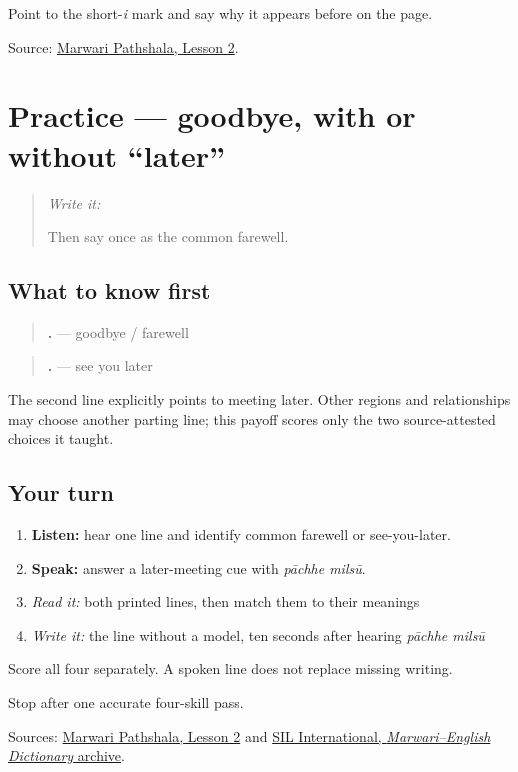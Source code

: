 \begin{tcolorbox}[breakable,colback=teal!4,colframe=teal!35!black,title={Before you move on}]
Point to the short-\emph{i} mark and say why it appears before \textbf{} on the page.

Source: \href{https://www.marwaripathshala.com/marwari-lesson-2-english}{Marwari Pathshala, Lesson 2}.
\end{tcolorbox}
\section[Practice]{Practice — goodbye, with or without “later”}

\label{lesson:MW-C07-practice}



\begin{quote}
\emph{Write it:} \textbf{}

Then say \textbf{  } once as the common farewell.
\end{quote}

\subsection*{What to know first}
\begin{quote}
\textbf{  .} — goodbye / farewell
\end{quote}

\begin{quote}
\textbf{ .} — see you later
\end{quote}

The second line explicitly points to meeting later. Other regions and relationships may choose another parting line; this payoff scores only the two source-attested choices it taught.

\subsection*{Your turn}
\begin{enumerate}
\raggedright
  \item \textbf{Listen:} hear one line and identify common farewell or see-you-later.
  \item \textbf{Speak:} answer a later-meeting cue with \emph{pāchhe milsū}.
  \item \emph{Read it:} both printed lines, then match them to their meanings
  \item \emph{Write it:} the line without a model, ten seconds after hearing \emph{pāchhe milsū}
\end{enumerate}

Score all four separately. A spoken line does not replace missing writing.

\begin{tcolorbox}[breakable,colback=teal!4,colframe=teal!35!black,title={Before you move on}]
Stop after one accurate four-skill pass.

Sources: \href{https://www.marwaripathshala.com/marwari-lesson-2-english}{Marwari Pathshala, Lesson 2} and \href{https://nepal.sil.org/resources/archives/63768}{SIL International, \emph{Marwari–English Dictionary} archive}.
\end{tcolorbox}
